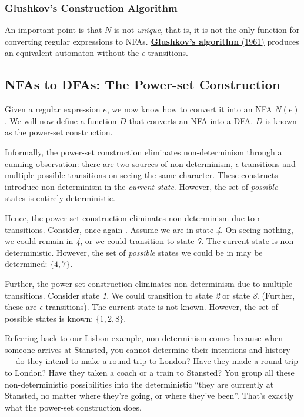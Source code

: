 \subsubsection{Glushkov's Construction Algorithm}
An important point is that $N$ is not \emph{unique}, that is, it is not the only function for converting regular expressions to NFAs. \href{https://en.wikipedia.org/wiki/Glushkov\%27s\_construction_algorithm}{\textbf{Glushkov's algorithm} (1961)} produces an equivalent automaton without the $\epsilon$-transitions.

\subsection{NFAs to DFAs: The Power-set Construction}
Given a regular expression $e$, we now know how to convert it into an NFA $N(e)$. We will now define a function $D$ that converts an NFA into a DFA. $D$ is known as the power-set construction. 

Informally, the power-set construction eliminates non-determinism through a cunning observation: there are two sources of non-determinism, $\epsilon$-transitions and multiple possible transitions on seeing the same character. These constructs introduce non-determinism in the \emph{current state}. However, the set of \emph{possible} states is entirely deterministic. 

Hence, the power-set construction eliminates non-determinism due to $\epsilon$-transitions. Consider, once again . Assume we are in state \textit{4}. On seeing nothing, we could remain in \textit{4}, or we could transition to state \textit{7}. The current state is non-deterministic. However, the set of \emph{possible} states we could be in may be determined: $\{ \textit{4}, \textit{7} \}$. 

Further, the power-set construction eliminates non-determinism due to multiple transitions. Consider state \textit{1}. We could transition to state \textit{2} or state \textit{8}. (Further, these are $\epsilon$-transitions). The current state is not known. However, the set of possible states is known: $\{ \textit{1}, \textit{2}, \textit{8} \}$.

Referring back to our Lisbon example, non-determinism comes because when someone arrives at Stansted, you cannot determine their intentions and history --- do they intend to make a round trip to London? Have they made a round trip to London? Have they taken a coach or a train to Stansted? You group all these non-deterministic possibilities into the deterministic ``they are currently at Stansted, no matter where they're going, or where they've been''. That's exactly what the power-set construction does.


